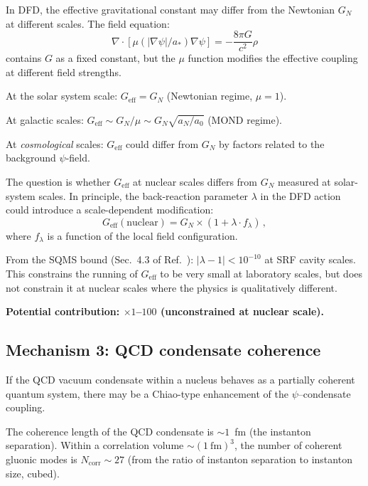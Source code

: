 \documentclass[aps,prd,twocolumn,superscriptaddress,floatfix,nofootinbib]{revtex4-2}
\newcommand{\astar}{a_*}
\newcommand{\mufunction}{\mu}
\newcommand{\lam}{\lambda}
\begin{document}
In DFD, the effective gravitational constant may differ from the Newtonian
$G_N$ at different scales. The field equation:
\begin{equation}
\nabla \cdot [\mufunction(|\nabla\psi|/\astar) \nabla\psi]
= -\frac{8\pi G}{c^2} \rho
\end{equation}
contains $G$ as a fixed constant, but the $\mufunction$ function modifies the
effective coupling at different field strengths.

At the solar system scale: $G_{\mathrm{eff}} = G_N$ (Newtonian regime,
$\mufunction = 1$).

At galactic scales: $G_{\mathrm{eff}} \sim G_N / \mufunction \sim G_N
\sqrt{a_N/a_0}$ (MOND regime).

At \emph{cosmological} scales: $G_{\mathrm{eff}}$ could differ from $G_N$
by factors related to the background $\psi$-field.

The question is whether $G_{\mathrm{eff}}$ at nuclear scales differs from
$G_N$ measured at solar-system scales. In principle, the back-reaction
parameter $\lam$ in the DFD action could introduce a scale-dependent
modification:
\begin{equation}
G_{\mathrm{eff}}(\text{nuclear}) = G_N \times (1 + \lam \cdot f_{\lam}) \, ,
\end{equation}
where $f_\lam$ is a function of the local field configuration.

From the SQMS bound (Sec.~4.3 of Ref.~\cite{CoreField}):
$|\lam - 1| < 10^{-10}$ at SRF cavity scales. This constrains the running
of $G_{\mathrm{eff}}$ to be very small at laboratory scales, but does not
constrain it at nuclear scales where the physics is qualitatively different.

\textbf{Potential contribution: $\times 1$--$100$ (unconstrained at nuclear
scale).}

\subsection{Mechanism 3: QCD condensate coherence}
\label{sec:qcd_coherence}

If the QCD vacuum condensate within a nucleus behaves as a partially coherent
quantum system, there may be a Chiao-type enhancement of the $\psi$--condensate
coupling.

The coherence length of the QCD condensate is $\sim 1$~fm (the instanton
separation). Within a correlation volume $\sim (1~\text{fm})^3$, the
number of coherent gluonic modes is $N_{\mathrm{corr}} \sim 27$ (from the
ratio of instanton separation to instanton size, cubed).
\end{document}
